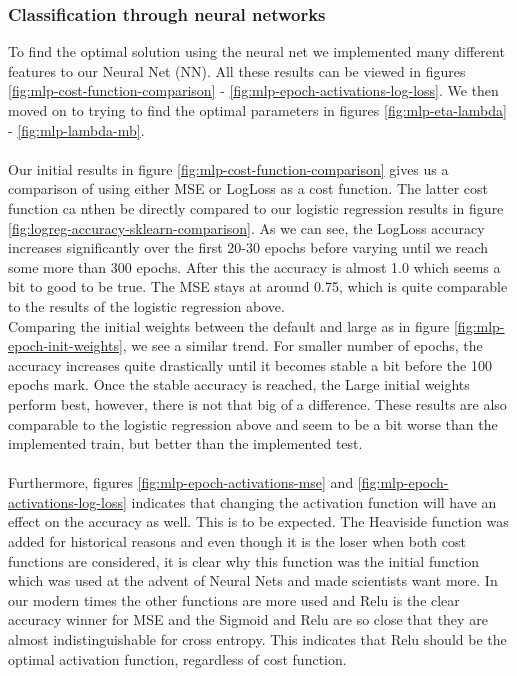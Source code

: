 \subsubsection{Classification through neural networks}
To find the optimal solution using the neural net we implemented many different features to our Neural Net (NN). All these results can be viewed in figures \ref{fig:mlp-cost-function-comparison} - \ref{fig:mlp-epoch-activations-log-loss}. We then moved on to trying to find the optimal parameters in figures \ref{fig:mlp-eta-lambda} - \ref{fig:mlp-lambda-mb}. \\ \\
Our initial results in figure \ref{fig:mlp-cost-function-comparison} gives us a comparison of using either MSE or LogLoss as a cost function. The latter cost function ca nthen be directly compared to our logistic regression results in figure \ref{fig:logreg-accuracy-sklearn-comparison}. As we can see, the LogLoss accuracy increases significantly over the first 20-30 epochs before varying until we reach some more than 300 epochs. After this the accuracy is almost 1.0 which seems a bit to good to be true. The MSE stays at around 0.75, which is quite comparable to the results of the logistic regression above. \\
Comparing the initial weights between the default and large as in figure \ref{fig:mlp-epoch-init-weights}, we see a similar trend. For smaller number of epochs, the accuracy increases quite drastically until it becomes stable a bit before the 100 epochs mark. Once the stable accuracy is reached, the Large initial weights perform best, however, there is not that big of a difference. These results are also comparable to the logistic regression above and seem to be a bit worse than the implemented train, but better than the implemented test. \\ \\
Furthermore, figures \ref{fig:mlp-epoch-activations-mse} and \ref{fig:mlp-epoch-activations-log-loss} indicates that changing the activation function will have an effect on the accuracy as well. This is to be expected. The Heaviside function was added for historical reasons and even though it is the loser when both cost functions are considered, it is clear why this function was the initial function which was used at the advent of Neural Nets and made scientists want more. In our modern times the other functions are more used and Relu is the clear accuracy winner for MSE and the Sigmoid and Relu are so close that they are almost indistinguishable for cross entropy. This indicates that Relu should be the optimal activation function, regardless of cost function. \\
